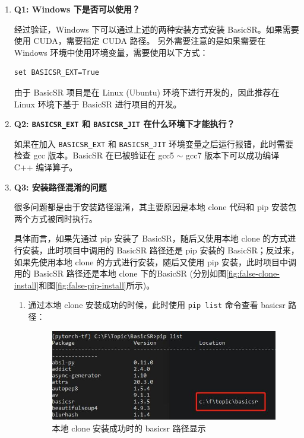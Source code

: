 \documentclass[../main.tex]{subfiles}
\begin{document}
\begin{enumerate}
    \item \textbf{Q1: Windows 下是否可以使用？}

    经过验证，Windows 下可以通过上述的两种安装方式安装 BasicSR。如果需要使用 CUDA，需要指定 CUDA 路径。	另外需要注意的是如果需要在 Windows 环境中使用环境变量，需要使用以下方式：
       \begin{verbatim}
set BASICSR_EXT=True
       \end{verbatim}

    由于 BasicSR 项目是在 Linux (Ubuntu) 环境下进行开发的，因此推荐在 Linux 环境下基于 BasicSR 进行项目的开发。

    \item \textbf{Q2: \texttt{BASICSR\_EXT} 和 \texttt{BASICSR\_JIT} 在什么环境下才能执行？}

    如果在加入 \texttt{BASICSR\_EXT} 和 \texttt{BASICSR\_JIT} 环境变量之后运行报错，此时需要检查 gcc 版本。BasicSR 在已被验证在 gcc5 $\sim$ gcc7 版本下可以成功编译 C++ 编译算子。

    \item \textbf{Q3: 安装路径混淆的问题}

    很多问题都是由于安装路径混淆，其主要原因是本地 clone 代码和 pip 安装包两个方式被同时执行。

    具体而言，如果先通过 pip 安装了 BasicSR，随后又使用本地 clone 的方式进行安装，此时项目中调用的 BasicSR 路径还是 pip 安装的 BasicSR；反过来，如果先使用本地 clone 的方式进行安装，随后又使用 pip 安装，此时项目中调用的 BasicSR 路径还是本地 clone 下的BasicSR (分别如图\ref{fig:false-clone-install}和图\ref{fig:false-pip-install}所示)。

\begin{enumerate}
    \item 通过本地 clone 安装成功的时候，此时使用 \texttt{pip list} 命令查看 basicsr 路径：
    \begin{figure}[H]
    \begin{center}
        \includegraphics[width=0.7\linewidth]{figures/installation_clone_install_location.jpg}
        \caption{本地 clone 安装成功时的 basicsr 路径显示}
        \label{fig:correct-clone-install}
    \end{center}
    \vspace{-0.5cm}
    \end{figure}


\end{enumerate}
\end{enumerate}
\end{document}
